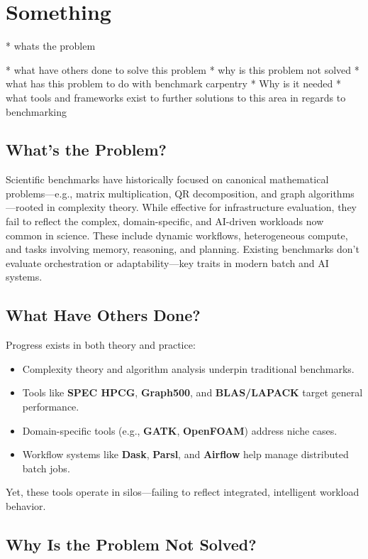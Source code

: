 \section{Something}

* whats the problem

* what have others done to solve this problem
* why is this problem not solved
* what has this problem to do with benchmark carpentry
* Why is it needed
* what tools and frameworks exist to further solutions to this 
 area in regards to benchmarking

 

\subsection{\textbf{What’s the Problem?}}

Scientific benchmarks have historically focused on canonical mathematical problems—e.g., matrix multiplication, QR decomposition, and graph algorithms—rooted in complexity theory. While effective for infrastructure evaluation, they fail to reflect the complex, domain-specific, and AI-driven workloads now common in science. These include dynamic workflows, heterogeneous compute, and tasks involving memory, reasoning, and planning. Existing benchmarks don't evaluate orchestration or adaptability—key traits in modern batch and AI systems.

\subsection{\textbf{What Have Others Done?}}

Progress exists in both theory and practice:

\begin{itemize}
    \item Complexity theory and algorithm analysis underpin traditional benchmarks.
    \item Tools like \textbf{SPEC HPCG}, \textbf{Graph500}, and \textbf{BLAS/LAPACK} target general performance.
    \item Domain-specific tools (e.g., \textbf{GATK}, \textbf{OpenFOAM}) address niche cases.
    \item Workflow systems like \textbf{Dask}, \textbf{Parsl}, and \textbf{Airflow} help manage distributed batch jobs.
\end{itemize}
Yet, these tools operate in silos—failing to reflect integrated, intelligent workload behavior.

\subsection{\textbf{Why Is the Problem Not Solved?}}

